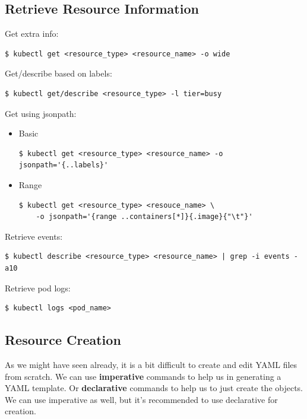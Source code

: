 \documentclass{article}
\newenvironment{codetemplate}[1][]{%
  \mybasecolorbox[#1]
  \itshape
}{%
  \endmybasecolorbox
}
\begin{document}
\subsection{Retrieve Resource Information}
Get extra info:
\begin{codetemplate}{}
\begin{verbatim}
$ kubectl get <resource_type> <resource_name> -o wide
\end{verbatim}
\end{codetemplate}

Get/describe based on labels:
\begin{codetemplate}{}
\begin{verbatim}
$ kubectl get/describe <resource_type> -l tier=busy
\end{verbatim}
\end{codetemplate}

Get using jsonpath:
\begin{itemize}
    \item Basic
\begin{codetemplate}
\begin{verbatim}
$ kubectl get <resource_type> <resource_name> -o jsonpath='{..labels}'
\end{verbatim}
\end{codetemplate}

    \item Range
\begin{codetemplate}
\begin{verbatim}
$ kubectl get <resource_type> <resouce_name> \
    -o jsonpath='{range ..containers[*]}{.image}{"\t"}'
\end{verbatim}
\end{codetemplate}
\end{itemize}

Retrieve events:
\begin{codetemplate}
\begin{verbatim}
$ kubectl describe <resource_type> <resource_name> | grep -i events -a10
\end{verbatim}
\end{codetemplate}

Retrieve pod logs:
\begin{codetemplate}
\begin{verbatim}
$ kubectl logs <pod_name>
\end{verbatim}
\end{codetemplate}

\subsection{Resource Creation}
As we might have seen already, it is a bit difficult to create and edit YAML files 
from scratch. We can use \textbf{imperative} commands to help us in generating a 
YAML template. Or \textbf{declarative} commands to help us to just create the objects.
We can use imperative as well, but it's recommended to use declarative for creation.
\end{document}
